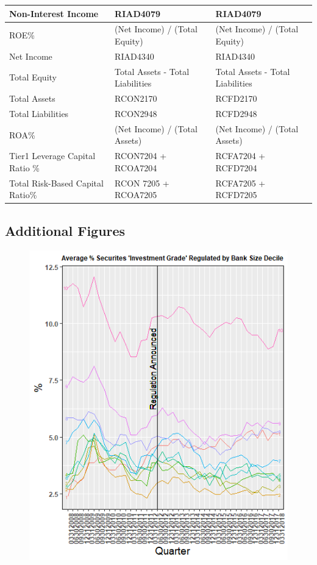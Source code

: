 \documentclass[preprint,12pt]{elsarticle}
\begin{document}
\begin{table}[!htbp]
\begin{tabular} {|m{}|m{}|m{}|}
 \hline
 Non-Interest Income & RIAD4079 & RIAD4079 \\ 
 \hline 
 ROE\% & (Net Income) / (Total Equity) & (Net Income) / (Total Equity) \\ 
 \hline
 Net Income & RIAD4340 & RIAD4340 \\ 
 \hline
 Total Equity & Total Assets - Total Liabilities & Total Assets - Total Liabilities \\ 
 \hline
 Total Assets & RCON2170 & RCFD2170 \\ 
 \hline
 Total Liabilities & RCON2948 & RCFD2948 \\ 
 \hline
 ROA\% & (Net Income) / (Total Assets) & (Net Income) / (Total Assets) \\ 
 \hline
 Tier1 Leverage Capital Ratio \% & RCON7204 + RCOA7204 & RCFA7204 + RCFD7204 \\ 
 \hline
 Total Risk-Based Capital Ratio\% & RCON 7205 + RCOA7205 & RCFA7205 + RCFD7205 \\ 
 \hline
\end{tabular}
\end{table}
 
\subsection{Additional Figures}

\begin{figure}[h!]
\centering
\caption{}
\label{Figure 5}
\includegraphics[width = .97\linewidth]{Rplot03}
\end{figure}
\end{document}
